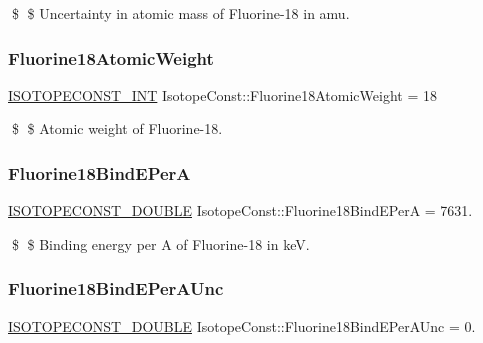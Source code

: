 \$ \$ Uncertainty in atomic mass of Fluorine-\/18 in amu. \mbox{\label{group___isotope_const-_fluorine-_f18_ga4f87f9fad76f501db14275934be1b205}} 
\subsubsection{\texorpdfstring{Fluorine18\+Atomic\+Weight}{Fluorine18AtomicWeight}}
{\footnotesize\ttfamily \mbox{\hyperlink{group___isotope_const-_macros_ga5f18360b3e99483a35c32d789e62621c}{I\+S\+O\+T\+O\+P\+E\+C\+O\+N\+S\+T\+\_\+\+I\+NT}} Isotope\+Const\+::\+Fluorine18\+Atomic\+Weight = 18}

\$ \$ Atomic weight of Fluorine-\/18. \mbox{\label{group___isotope_const-_fluorine-_f18_gada16ca3e83863a861f338fd91041a089}} 
\subsubsection{\texorpdfstring{Fluorine18\+Bind\+E\+PerA}{Fluorine18BindEPerA}}
{\footnotesize\ttfamily \mbox{\hyperlink{group___isotope_const-_macros_ga8f45a7272ce02c0b4c65c44636ed719a}{I\+S\+O\+T\+O\+P\+E\+C\+O\+N\+S\+T\+\_\+\+D\+O\+U\+B\+LE}} Isotope\+Const\+::\+Fluorine18\+Bind\+E\+PerA = 7631.}

\$ \$ Binding energy per A of Fluorine-\/18 in keV. \mbox{\label{group___isotope_const-_fluorine-_f18_ga0eadab57a78bc03bbaafd0df26428f4f}} 
\subsubsection{\texorpdfstring{Fluorine18\+Bind\+E\+Per\+A\+Unc}{Fluorine18BindEPerAUnc}}
{\footnotesize\ttfamily \mbox{\hyperlink{group___isotope_const-_macros_ga8f45a7272ce02c0b4c65c44636ed719a}{I\+S\+O\+T\+O\+P\+E\+C\+O\+N\+S\+T\+\_\+\+D\+O\+U\+B\+LE}} Isotope\+Const\+::\+Fluorine18\+Bind\+E\+Per\+A\+Unc = 0.}

